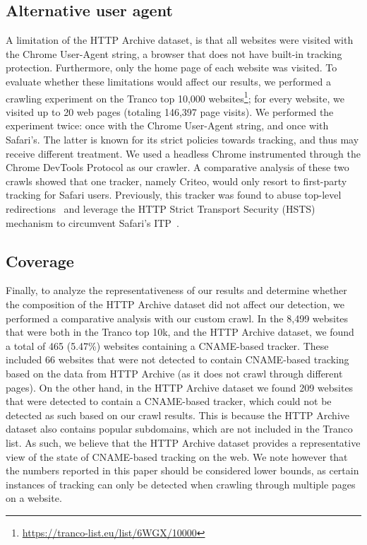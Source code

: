 \subsection{Alternative user agent}
A limitation of the HTTP Archive dataset, is that all websites were visited with the Chrome User-Agent string, a browser that does not have built-in tracking protection. 
Furthermore, only the home page of each website was visited.
To evaluate whether these limitations would affect our results, we performed a crawling experiment on the Tranco top 10,000 websites\footnote{\url{https://tranco-list.eu/list/6WGX/10000}}; for every website, we visited up to 20 web pages (totaling 146,397 page visits). 
We performed the experiment twice: once with the Chrome User-Agent string, and once with Safari's.
The latter is known for its strict policies towards tracking, and thus may receive different treatment.
We used a headless Chrome instrumented through the Chrome DevTools Protocol \cite{chromedevtools} as our crawler. 
A comparative analysis of these two crawls showed that one tracker, namely Criteo, would only resort to first-party tracking for Safari users.
Previously, this tracker was found to abuse top-level redirections~\cite{criteofirstparty} and leverage the HTTP Strict Transport Security (HSTS) mechanism to circumvent Safari's ITP~\cite{criteohsts,Apple-HSTS-Abuse}.


\subsection{Coverage}
Finally, to analyze the representativeness of our results and determine whether the composition of the HTTP Archive dataset did not affect our detection, we performed a comparative analysis with our custom crawl.
In the 8,499 websites that were both in the Tranco top 10k, and the HTTP Archive dataset, we found a total of 465 (5.47\%) websites containing a CNAME-based tracker.
These included 66 websites that were not detected to contain CNAME-based tracking based on the data from HTTP Archive (as it does not crawl through different pages).
On the other hand, in the HTTP Archive dataset we found 209 websites that were detected to contain a CNAME-based tracker, which could not be detected as such based on our crawl results.
This is because the HTTP Archive dataset also contains popular subdomains, which are not included in the Tranco list.
As such, we believe that the HTTP Archive dataset provides a representative view of the state of CNAME-based tracking on the web.
We note however that the numbers reported in this paper should be considered lower bounds, as certain instances of tracking can only be detected when crawling through multiple pages on a website.



